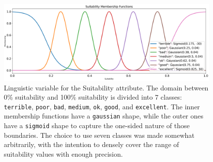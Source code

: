 \begin{figure}[H]
    \centering
    \includegraphics[width=\columnwidth,trim={0cm 0 0cm 0cm},clip]{figures/ProofOfConcepts/suitability_membership_functions.png}
    \caption[Linguistic variable for the Suitability attribute]{
        Linguistic variable for the Suitability attribute. The domain between 0\% suitability and 100\% suitability is divided into 7 classes: \texttt{terrible}, \texttt{poor}, \texttt{bad}, \texttt{medium}, \texttt{ok}, \texttt{good}, and \texttt{excellent}. The inner membership functions have a \texttt{gaussian} shape, while the outer ones have a \texttt{sigmoid} shape to capture the one-sided nature of those boundaries. The choice to use seven classes was made somewhat arbitrarily, with the intention to densely cover the range of suitability values with enough precision.
    }
    \label{fig:suitabilityClasses}
\end{figure}




